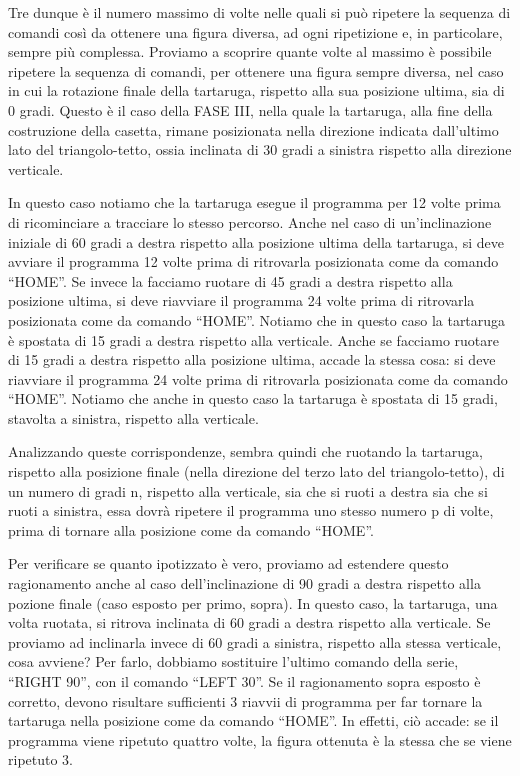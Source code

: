 Tre dunque è il numero massimo di volte nelle quali si può ripetere la sequenza
di comandi così da ottenere una figura diversa, ad ogni ripetizione e, in
particolare, sempre più complessa. Proviamo a scoprire quante volte al massimo
è possibile ripetere la sequenza di comandi, per ottenere una figura sempre
diversa, nel caso in cui la rotazione finale della tartaruga, rispetto alla sua
posizione ultima, sia di 0 gradi. Questo è il caso della FASE III, nella quale
la tartaruga, alla fine della costruzione della casetta, rimane posizionata
nella direzione indicata dall’ultimo lato del triangolo-tetto, ossia inclinata
di 30 gradi a sinistra rispetto alla direzione verticale. 

In questo caso notiamo che la tartaruga esegue il programma per 12 volte prima
di ricominciare a tracciare lo stesso percorso. Anche nel caso di
un’inclinazione iniziale di 60 gradi a destra rispetto alla posizione ultima
della tartaruga, si deve avviare il programma 12 volte prima di ritrovarla
posizionata come da comando “HOME”. Se invece la facciamo ruotare di 45 gradi a
destra rispetto alla posizione ultima, si deve riavviare il programma 24 volte
prima di ritrovarla posizionata come da comando “HOME”. Notiamo che in questo
caso la tartaruga è spostata di 15 gradi a destra rispetto alla verticale.
Anche se facciamo ruotare di 15 gradi a destra rispetto alla posizione ultima,
accade la stessa cosa: si deve riavviare il programma 24 volte prima di
ritrovarla posizionata come da comando “HOME”. Notiamo che anche in questo caso
la tartaruga è spostata di 15 gradi, stavolta a sinistra, rispetto alla
verticale.

Analizzando queste corrispondenze, sembra quindi che ruotando la tartaruga,
rispetto alla posizione finale (nella direzione del terzo lato del
triangolo-tetto), di un numero di gradi n, rispetto alla verticale, sia che si
ruoti a destra sia che si ruoti a sinistra, essa dovrà ripetere il programma
uno stesso numero p di volte, prima di tornare alla posizione come da comando
“HOME”. 

Per verificare se quanto ipotizzato è vero, proviamo ad estendere questo
ragionamento anche al caso dell’inclinazione di 90 gradi a destra rispetto alla
pozione finale (caso esposto per primo, sopra). In questo caso, la tartaruga,
una volta ruotata, si ritrova inclinata di 60 gradi a destra rispetto alla
verticale. Se proviamo ad inclinarla invece di 60 gradi a sinistra, rispetto
alla stessa verticale, cosa avviene? Per farlo, dobbiamo sostituire l’ultimo
comando della serie, “RIGHT 90”, con il comando “LEFT 30”. Se il ragionamento
sopra esposto è corretto, devono risultare sufficienti 3 riavvii di programma
per far tornare la tartaruga nella posizione come da comando “HOME”. In
effetti, ciò accade: se il programma viene ripetuto quattro volte, la figura
ottenuta è la stessa che se viene ripetuto 3.

